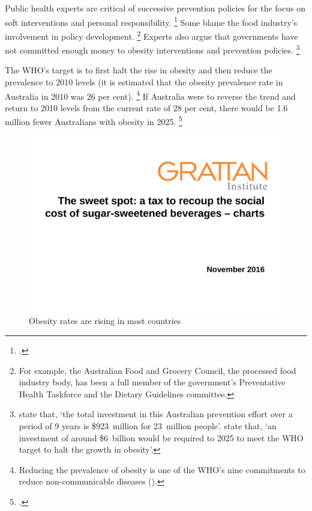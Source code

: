 \documentclass[embargoed]{grattan}
\begin{document}
Public health experts are critical of successive prevention policies for the focus on soft interventions and personal responsibility.%
\footcites{Capacci2012Policiespromotehealthy}{Swinburn2013Progressobesityprevention}{Australia2015NoTimeWeight} Some blame the food industry's involvement in policy development.%
\footnote{\textcites{Swinburn2013Progressobesityprevention}{Roberto2015Patchyprogressobesity}{Brownell2009perilsignoringhistory} %
For example, the Australian Food and Grocery Council, the processed food industry body, has been a full member of the government's Preventative Health Taskforce and the Dietary Guidelines committee.} Experts also argue that governments have not committed enough money to obesity interventions and prevention policies.%
\footnote{\textcite{Swinburn2013Progressobesityprevention} state that, `the total investment in this Australian prevention effort over a period of 9 years is \$923~million for 23~million people'. \textcite{Australia2015NoTimeWeight} state that, `an investment of around \$6~billion would be required to 2025 to meet the WHO target to halt the growth in obesity'.}

The WHO's target is to first halt the rise in obesity and then reduce the prevalence to 2010 levels (it is estimated that the obesity prevalence rate in Australia in 2010 was 26 per cent).%
\footnote{Reducing the prevalence of obesity is one of the WHO's nine commitments to reduce non-communicable diseases (\textcites{Organization2013GlobalActionPlan}{Organization2016ObesityoverweightFact}).} If Australia were to reverse the trend and return to 2010 levels from the current rate of 28 per cent, there would be 1.6 million fewer Australians with obesity in 2025.%
\footcite{Australia2015NoTimeWeight}

\begin{figure}
\caption{Obesity rates are rising in most countries }\label{fig:Obesity-rates-are-rising-in-most-countries}

\includegraphics[page=3]{atlas/ObesityCharts}


\end{figure}
\end{document}
